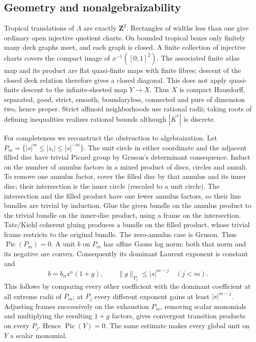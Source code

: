 \subsection{Geometry and nonalgebraizability}
Tropical translations of $\Lambda$ are exactly $\mathbf Z^2$. Rectangles of
widths less than one give ordinary open injective quotient charts. On bounded
tropical boxes only finitely many deck graphs meet, and each graph is closed.
A finite collection of injective charts covers the compact image of
$x^{-1}([0,1]^2)$. The associated finite atlas map and its product are flat
quasi-finite maps with finite fibres; descent of the closed deck relation
therefore gives a closed diagonal. This does not apply quasi-finite descent
to the infinite-sheeted map $Y\to X$. Thus $X$ is compact Hausdorff,
separated, good, strict, smooth, boundaryless, connected and pure of dimension
two, hence proper. Strict affinoid neighborhoods use rational radii; taking
roots of defining inequalities realizes rational bounds although $|K^*|$
is discrete.

For completeness we reconstruct the obstruction to algebraization.
Let $P_m=\{|s|^m\le |z_i|\le |s|^{-m}\}$.
The unit circle in either coordinate and the adjacent filled disc have trivial
Picard group by Gruson's determinant consequence. Induct on the number of annulus factors in a mixed product of discs,
circles and annuli. To remove one annulus factor, cover the filled disc by
that annulus and its inner disc; their intersection is the inner circle
(rescaled to a unit circle). The intersection and the filled product have
one fewer annulus factors, so their line bundles are trivial by induction.
Glue the given bundle on the annulus product to the trivial bundle on the
inner-disc product, using a frame on the intersection. Tate/Kiehl coherent
gluing produces a bundle on the filled product, whose trivial frame restricts
to the original bundle. The zero-annulus case is Gruson. Thus
$\operatorname{Pic}(P_m)=0$.
A unit $b$ on $P_m$ has affine Gauss log norm: both that norm and its negative
are convex. Consequently its dominant Laurent exponent is constant and
\[
 b=b_\alpha z^\alpha(1+g),\qquad
 \|g\|_{P_j}\le |s|^{m-j}\quad(j<m).
\]
This follows by comparing every other coefficient with the dominant coefficient
at all extreme radii of $P_m$; at $P_j$ every different exponent gains at
least $|s|^{m-j}$. Adjusting frames successively on the exhaustion $P_m$,
removing scalar monomials and multiplying the resulting $1+g$ factors, gives
convergent transition products on every $P_j$. Hence
$\operatorname{Pic}(Y)=0$. The same estimate makes every global unit on $Y$
a scalar monomial.

